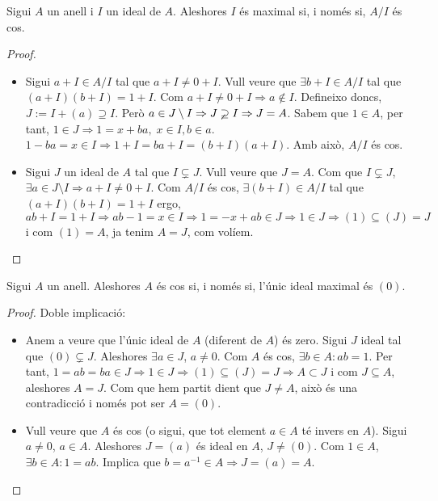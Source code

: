 \documentclass[../main.tex]{subfiles}
\begin{document}
\begin{prop}
\label{prop:maximalsiicos} Sigui $A$ un anell i $I$ un ideal de $A$. Aleshores $I$ és maximal si, i només si, $A/I$ és cos.
\end{prop}
\begin{proof}
\begin{itemize}
    \item \fbox{$\Rightarrow$} Sigui $a+I\in A/I$ tal que $a+I\not=0+I$. Vull veure que $\exists b+I\in A/I$ tal que $(a+I)(b+I) = 1+I$. Com $a+I\not= 0+I \Rightarrow a\not\in I$. Defineixo doncs, $J:=I+(a)\supseteq I$. Però $a\in J\setminus I\Rightarrow J\varsupsetneq I \Rightarrow J = A$. Sabem que $1\in A$, per tant, $1\in J\Rightarrow 1 = x+ba,\;x\in I,b\in a$. $1-ba=x\in I\Rightarrow 1+I = ba+I = (b+I)(a+I)$. Amb això, $A/I$ és cos.
    \item \fbox{$\Leftarrow$} Sigui $J$ un ideal de $A$ tal que $I\varsubsetneq J$. Vull veure que $J = A$. Com que $I\varsubsetneq J$, $\exists a\in J\setminus I \Rightarrow a+I\not= 0+I$. Com $A/I$ és cos, $\exists(b+I)\in A/I$ tal que $(a+I)(b+I) = 1+I$ ergo, $ab+I = 1+I \Rightarrow ab-1 = x\in I \Rightarrow 1=-x+ab\in J\Rightarrow 1\in J\Rightarrow (1)\subseteq (J) = J$ i com $(1) = A$, ja tenim $A = J$, com volíem.
\end{itemize}
\end{proof}

\begin{prop}
\label{prop:idealsaescos} Sigui $A$ un anell. Aleshores $A$ és cos si, i només si, l'únic ideal maximal és $(0)$.
\end{prop}
\begin{proof}
Doble implicació:
\begin{itemize}
    \item \fbox{$\Rightarrow$} Anem a veure que l'únic ideal de $A$ (diferent de $A$) és zero. Sigui $J$ ideal tal que $(0)\varsubsetneq J$. Aleshores $\exists a\in J$, $a\not=0$. Com $A$ és cos, $\exists b\in A: ab=1$. Per tant, $1=ab=ba\in J \Rightarrow 1\in J\Rightarrow (1)\subseteq (J)=J \Rightarrow A\subset J$ i com $J\subseteq A$, aleshores $A=J$. Com que hem partit dient que $J\not=A$, això és una contradicció i només pot ser $A = (0)$.
    \item \fbox{$\Leftarrow$} Vull veure que $A$ és cos (o sigui, que tot element $a\in A$ té invers en $A$). Sigui $a\not=0$, $a\in A$. Aleshores $J = (a)$ és ideal en $A$, $J\not=(0)$. Com $1\in A$, $\exists b\in A: 1=ab$. Implica que $b=a^{-1}\in A\Rightarrow J = (a) = A$.
\end{itemize}
\end{proof}
\end{document}
